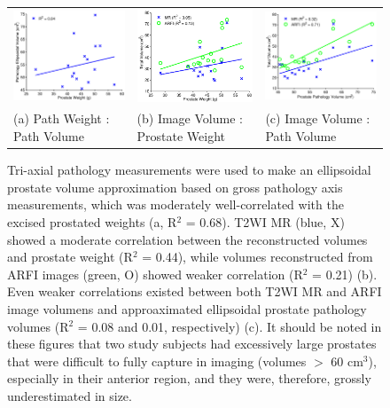 \begin{figure}[htb!]
\centering
\begin{tabular}{lll}
\includegraphics[width=0.3\linewidth]{figs/corr_path_vol_weight_vol} &
\includegraphics[width=0.3\linewidth]{figs/corr_weight_vol} &
\includegraphics[width=0.3\linewidth]{figs/corr_pathVol_vol} \\
(a) Path Weight : Path Volume & (b) Image Volume : Prostate Weight & (c) Image Volume : Path Volume \\
\end{tabular}
\caption{Tri-axial pathology measurements were used to make an ellipsoidal
    prostate volume approximation based on gross pathology axis measurements,
    which was moderately well-correlated with the excised prostated weights (a,
    R$^2$ = 0.68).  T2WI MR (blue, X) showed a moderate correlation between the
    reconstructed volumes and prostate weight (R$^2$ = 0.44), while volumes
    reconstructed from ARFI images (green, O) showed weaker correlation (R$^2$
    = 0.21) (b).  Even weaker correlations existed between both T2WI MR and
    ARFI image volumens and approaximated ellipsoidal prostate pathology
    volumes (R$^2$ = 0.08 and 0.01, respectively) (c).  It should be noted in
    these figures that two study subjects had excessively large prostates that
    were difficult to fully capture in imaging (volumes $>$ 60 cm$^3$),
    especially in their anterior region, and they were, therefore, grossly
    underestimated in size.}
\label{fig:mr_arfi_weight}
\end{figure}
